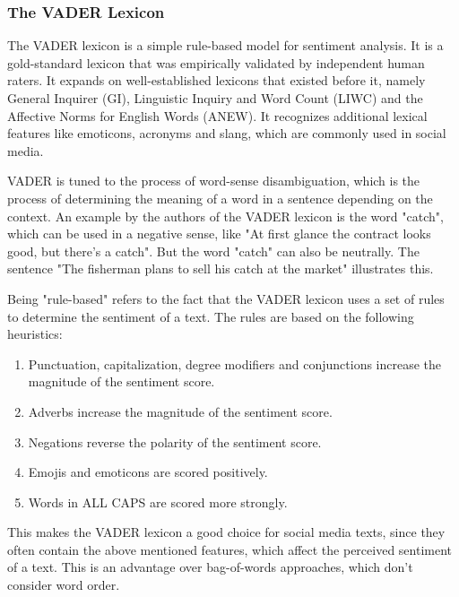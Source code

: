 \subsubsection*{The VADER Lexicon}

The VADER lexicon is a simple rule-based model for sentiment analysis. It is a gold-standard lexicon that was empirically validated by independent human raters. It expands on well-established lexicons that existed before it, namely General Inquirer (GI), Linguistic Inquiry and Word Count (LIWC) and the Affective Norms for English Words (ANEW). It recognizes additional lexical features like emoticons, acronyms and slang, which are commonly used in social media.~\cite{hutto2014vader}

VADER is tuned to the process of word-sense disambiguation, which is the process of determining the meaning of a word in a sentence depending on the context. An example by the authors of the VADER lexicon is the word "catch", which can be used in a negative sense, like "At first glance the contract looks good, but there's a catch". But the word "catch" can also be neutrally. The sentence "The fisherman plans to sell his catch at the market" illustrates this.~\cite{hutto2014vader}

Being "rule-based" refers to the fact that the VADER lexicon uses a set of rules to determine the sentiment of a text. The rules are based on the following heuristics:

\begin{enumerate}
    \item Punctuation, capitalization, degree modifiers and conjunctions increase the magnitude of the sentiment score.
    \item Adverbs increase the magnitude of the sentiment score.
    \item Negations reverse the polarity of the sentiment score.
    \item Emojis and emoticons are scored positively.
    \item Words in ALL CAPS are scored more strongly.
\end{enumerate}

This makes the VADER lexicon a good choice for social media texts, since they often contain the above mentioned features, which affect the perceived sentiment of a text. This is an advantage over bag-of-words approaches, which don't consider word order.

